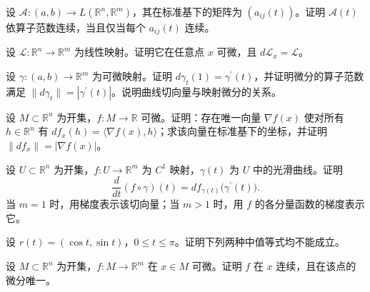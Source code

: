 \noindent\begin{minipage}{\textwidth}
设 $\mathcal A:(a,b)\to L(\mathbb R^n,\mathbb R^m)$，其在标准基下的矩阵为 $(a_{ij}(t))$。证明 $\mathcal A(t)$ 依算子范数连续，当且仅当每个 $a_{ij}(t)$ 连续。
\end{minipage}\par\vfill
\noindent\begin{minipage}{\textwidth}
设 $\mathcal L:\mathbb R^n\to\mathbb R^m$ 为线性映射。证明它在任意点 $x$ 可微，且 $d\mathcal L_x=\mathcal L$。
\end{minipage}\par\vfill
\noindent\begin{minipage}{\textwidth}
设 $\gamma:(a,b)\to\mathbb R^m$ 为可微映射。证明 $d\gamma_t(1)=\gamma^{\prime}(t)$，并证明微分的算子范数满足 $\|d\gamma_t\|=|\gamma^{\prime}(t)|$。说明曲线切向量与映射微分的关系。
\end{minipage}\par\vfill
\newpage
\noindent\begin{minipage}{\textwidth}
设 $M\subset\mathbb R^n$ 为开集，$f:M\to\mathbb R$ 可微。证明：存在唯一向量 $\nabla f(x)$ 使对所有 $h\in\mathbb R^n$ 有 $df_x(h)=\langle\nabla f(x),h\rangle$；求该向量在标准基下的坐标，并证明 $\|df_x\|=|\nabla f(x)|$。
\end{minipage}\par\vfill
\noindent\begin{minipage}{\textwidth}
设 $U\subset\mathbb R^n$ 为开集，$f:U\to\mathbb R^m$ 为 $C^1$ 映射，$\gamma(t)$ 为 $U$ 中的光滑曲线。证明\[\frac d{dt}(f\circ\gamma)(t)=df_{\gamma(t)}\bigl(\gamma^{\prime}(t)\bigr).\]当 $m=1$ 时，用梯度表示该切向量；当 $m>1$ 时，用 $f$ 的各分量函数的梯度表示它。
\end{minipage}\par\vfill
\noindent\begin{minipage}{\textwidth}
设 $r(t)=(\cos t,\sin t)$，$0\le t\le\pi$。证明下列两种中值等式均不能成立。
\end{minipage}\par\vfill
\noindent\begin{minipage}{\textwidth}
设 $M\subset\mathbb R^n$ 为开集，$f:M\to\mathbb R^m$ 在 $x\in M$ 可微。证明 $f$ 在 $x$ 连续，且在该点的微分唯一。
\end{minipage}\par\vfill
